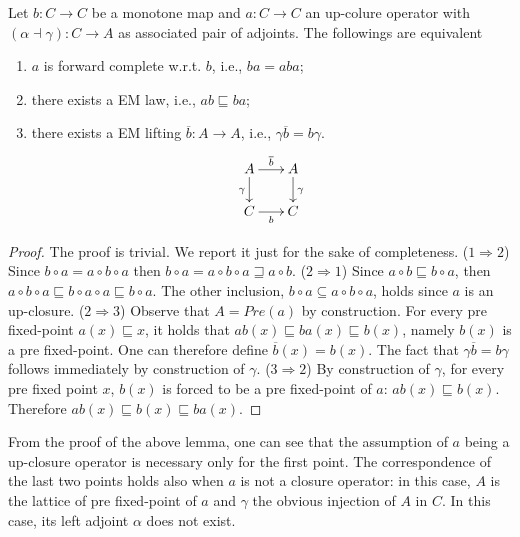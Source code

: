 \documentclass[smallcondensed,envcountsect,envcountsame]{svjour3}     %
\begin{document}
\begin{lemma}
Let $b\colon C\to C$ be a monotone map and $a\colon C\to C$ an up-colure operator with $(\alpha \dashv \gamma)\colon C \to A$ as associated pair of adjoints. 
%
The followings are equivalent
\begin{enumerate}
\item $a$ is forward complete w.r.t. $b$, i.e., $ba = aba$;
\item there exists a EM law, i.e., $ab \sqsubseteq ba$;
\item there exists a EM lifting $\overline{b}\colon A \to A$, i.e., $\gamma \overline{b} =  b \gamma$.
$$\xymatrix@R=0.2cm@C=0.2cm{
A \ar[rr]^{\overline{b}} \ar[dd]_\gamma & & A  \ar[dd]^\gamma \\ 
&  \\
C \ar[rr]_b & &  C 
}$$
\end{enumerate}
\end{lemma}
\begin{proof}
The proof is trivial. We report it just for the sake of completeness.
($1\Rightarrow 2$) Since $b\circ a = a\circ b\circ a$ then $b\circ a = a\circ b\circ a \sqsupseteq a\circ b$. 
%
($2\Rightarrow 1$) Since $a\circ b \sqsubseteq b\circ a$, then $a\circ b \circ a \sqsubseteq b\circ a \circ a \sqsubseteq b \circ a$. The other inclusion, $b\circ a \subseteq  a\circ b\circ a$, holds since $a$ is an up-closure.
%
 ($2\Rightarrow 3$) Observe that $A=Pre(a)$ by construction. For every pre fixed-point $a(x)\sqsubseteq x$, it holds that $ab(x) \sqsubseteq ba(x)\sqsubseteq b(x)$, namely $b(x)$ is a pre fixed-point. One can therefore define $\overline{b}(x) = b(x)$. The fact that $\gamma \overline{b} =  b \gamma$ follows immediately by construction of $\gamma$. 
 ($3 \Rightarrow 2$) By construction of $\gamma$, for every pre fixed point $x$, $b(x)$ is forced to be a pre fixed-point of $a$: $ab(x)\sqsubseteq b(x)$. Therefore  $ab(x)\sqsubseteq b(x) \sqsubseteq ba(x)$.
\end{proof}
%
\begin{remark}
From the proof of the above lemma, one can see that the assumption of $a$ being a up-closure operator is necessary only for  the first point. The correspondence of the last two points holds also when $a$ is not a closure operator: in this case, $A$ is the lattice of pre fixed-point of $a$ and $\gamma$ the obvious injection of $A$ in $C$. In this case, its left adjoint $\alpha$ does not exist.
\end{remark}
\end{document}
